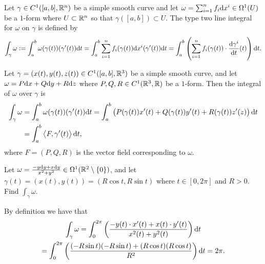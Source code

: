\documentclass[11pt,a4paper]{article}
\begin{document}
\begin{definition}
  \label{def:type-two-line-integral-for-one-forms}
  Let $\gamma \in C^1([a,b],\mathbb{R}^n)$ be a simple smooth curve
  and let $\omega = \sum_{i=1}^{n} f_i \dx^i \in \Omega^1(U)$
  be a $1$-form where $U \subset \mathbb{R}^n$ so that $\gamma([a,b]) \subset U$.
  The type two line integral for $\omega$ on $\gamma$ is defined by
  \[
    \int_{\gamma} \omega :=
    \int_{a}^{b} \omega(\gamma(t))(\gamma'(t)) \dt =
    \int_{a}^{b} \sum_{i=1}^{n} f_i(\gamma(t)) \dx^i(\gamma'(t)) \dt =
    \int_{a}^{b} \del{\sum_{i=1}^{n} f_i(\gamma(t)) \cdot
    \frac{\dif \gamma^i}{\dif t}(t)} \dt.
  \]
\end{definition}

\begin{example}
  Let $\gamma = (x(t),y(t),z(t))\in C^1([a,b],\mathbb{R}^3)$ be a simple smooth curve,
  and let $\omega = P \dx + Q \dy + R \dz$
  where $P,Q,R \in C^1(\mathbb{R}^3,\mathbb{R})$ be a $1$-form.
  Then the integral of $\omega$ over $\gamma$ is
  \begin{align*}
    \int_{\gamma} \omega &=
    \int_{a}^{b} \omega(\gamma(t))(\gamma'(t)) \dt =
    \int_{a}^{b}
    \del{P(\gamma(t)) x'(t) + Q(\gamma(t)) y'(t) + R(\gamma(t)) z'(z)} \dt \\ &=
    \int_{a}^{b} \ip{F}{\gamma'(t)} \dt,
  \end{align*}
  where $F = (P,Q,R)$ is the vector field corresponding to $\omega$.
\end{example}

\begin{exercise}
  Let $\omega = \frac{-y \dy + x \dy}{x^2 + y^2} \in \Omega^1(\R^2\setminus\set{0})$,
  and let $\gamma(t) = (x(t),y(t)) = (R\cos t,R\sin t)$ where $t \in [0,2\pi]$
  and $R > 0$.
  Find $\int_{\gamma} \omega$.
\end{exercise}
\begin{solution}
  By definition we have that
  \begin{multline*}
    \int_{\gamma} \omega =
    \int_{0}^{2\pi}
      \del{\frac{-y(t) \cdot x'(t) + x(t) \cdot y'(t)}{x^2(t) + y^2(t)}} \dt \\ =
    \int_{0}^{2\pi} \del{\frac{(-R \sin t)(-R \sin t) + (R \cos t)(R \cos t)}{R^2}} \dt = 2\pi.
  \end{multline*}
\end{solution}
\end{document}
